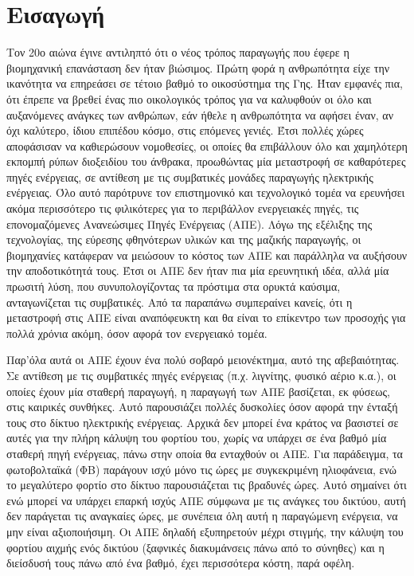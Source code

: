 \documentclass[12pt]{report}
\begin{document}
\chapter*{Εισαγωγή}
Τον 20ο αιώνα έγινε αντιληπτό ότι ο νέος τρόπος παραγωγής που έφερε η βιομηχανική επανάσταση δεν ήταν βιώσιμος. Πρώτη φορά η ανθρωπότητα είχε την ικανότητα
να επηρεάσει σε τέτοιο βαθμό το οικοσύστημα της Γης. Ήταν εμφανές πια, ότι έπρεπε να βρεθεί ένας πιο οικολογικός τρόπος για να καλυφθούν οι όλο και αυξανόμενες ανάγκες των ανθρώπων, εάν 
ήθελε η ανθρωπότητα να αφήσει έναν, αν όχι καλύτερο, ίδιου επιπέδου κόσμο, στις επόμενες γενιές.
Έτσι πολλές χώρες αποφάσισαν να καθιερώσουν νομοθεσίες, οι οποίες θα επιβάλλουν όλο και χαμηλότερη
εκπομπή ρύπων διοξειδίου του άνθρακα, προωθώντας μία μεταστροφή σε καθαρότερες πηγές ενέργειας, σε αντίθεση με τις συμβατικές μονάδες παραγωγής ηλεκτρικής ενέργειας.
Όλο αυτό παρότρυνε τον επιστημονικό και τεχνολογικό τομέα να ερευνήσει ακόμα περισσότερο τις φιλικότερες για το περιβάλλον ενεργειακές πηγές, τις επονομαζόμενες Ανανεώσιμες Πηγές Ενέργειας (ΑΠΕ). 
Λόγω της εξέλιξης της τεχνολογίας, της εύρεσης φθηνότερων υλικών και της μαζικής παραγωγής, οι βιομηχανίες κατάφεραν να μειώσουν το κόστος των ΑΠΕ και παράλληλα να αυξήσουν την αποδοτικότητά τους.
Έτσι οι ΑΠΕ δεν ήταν πια μία ερευνητική ιδέα, αλλά μία πρωσιτή λύση, που συνυπολογίζοντας τα πρόστιμα στα ορυκτά καύσιμα, ανταγωνίζεται τις συμβατικές.
Από τα παραπάνω συμπεραίνει κανείς, ότι η μεταστροφή στις ΑΠΕ είναι αναπόφευκτη και θα είναι το επίκεντρο των προσοχής για πολλά χρόνια ακόμη, όσον αφορά τον ενεργειακό τομέα. 

Παρ'όλα αυτά οι ΑΠΕ έχουν ένα πολύ σοβαρό μειονέκτημα, αυτό της αβεβαιότητας. Σε αντίθεση με τις συμβατικές πηγές ενέργειας (π.χ. λιγνίτης, φυσικό αέριο κ.α.), οι οποίες
έχουν μία σταθερή παραγωγή, η παραγωγή των ΑΠΕ βασίζεται, εκ φύσεως, στις καιρικές συνθήκες. Αυτό παρουσιάζει πολλές δυσκολίες όσον αφορά την ένταξή τους στο δίκτυο ηλεκτρικής ενέργειας.
Αρχικά δεν μπορεί ένα κράτος να βασιστεί σε αυτές για την πλήρη κάλυψη του φορτίου του, χωρίς να υπάρχει σε ένα βαθμό μία σταθερή πηγή ενέργειας, πάνω στην οποία θα ενταχθούν οι ΑΠΕ.
Για παράδειγμα, τα φωτοβολταϊκά (ΦΒ) παράγουν ισχύ μόνο τις ώρες με συγκεκριμένη ηλιοφάνεια, ενώ το μεγαλύτερο φορτίο στο δίκτυο παρουσιάζεται τις βραδυνές ώρες. Αυτό σημαίνει ότι ενώ μπορεί να υπάρχει επαρκή ισχύς ΑΠΕ
σύμφωνα με τις ανάγκες του δικτύου, αυτή δεν παράγεται τις αναγκαίες ώρες, με συνέπεια όλη αυτή η παραγώμενη ενέργεια, να μην είναι αξιοποιήσιμη. Οι ΑΠΕ δηλαδή εξυπηρετούν μέχρι στιγμής, την κάλυψη του φορτίου αιχμής
ενός δικτύου (ξαφνικές διακυμάνσεις πάνω από το σύνηθες) και η διείσδυσή τους πάνω από ένα βαθμό, έχει περισσότερα κόστη, παρά οφέλη. 
\end{document}

